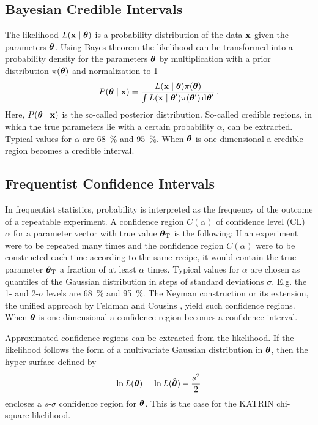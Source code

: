 \subsection{Bayesian Credible Intervals}
The likelihood $L\giventhat{\dataVec}{\paramVec}$ is a probability distribution of the data $\boldsymbol{\mathbf{x}}$ given the parameters $\boldsymbol{\mathbf{\theta}}$. Using Bayes theorem the likelihood can be transformed into a probability density for the parameters $\boldsymbol{\mathbf{\theta}}$ by multiplication with a prior distribution $\pi(\boldsymbol{\mathbf{\theta}})$ and normalization to 1
\begin{equation}
\label{eq:posterior}
	P\giventhat{\paramVec}{\dataVec} = 
		\frac{
			L\giventhat{\dataVec}{\paramVec}\pi(\paramVec)
		}{
			\int L\giventhat{\dataVec}{\paramVec^\prime}\pi(\paramVec^\prime) \d\paramVec^\prime
		}
	\fullstop
\end{equation}
Here, $P\giventhat{\paramVec}{\dataVec}$ is the so-called posterior distribution. So-called credible regions, in which the true parameters lie with a certain probability $\alpha$, can be extracted.  Typical values for $\alpha$ are \SI{68}{\percent} and \SI{95}{\percent}. When $\boldsymbol{\mathbf{\theta}}$ is one dimensional a credible region becomes a credible interval. 

\subsection{Frequentist Confidence Intervals}
In frequentist statistics, probability is interpreted as the frequency
of the outcome of a repeatable experiment. A confidence region $C(\alpha)$ of confidence level (CL) $\alpha$ for a parameter vector with true value $\boldsymbol{\mathbf{\theta}}_\mathrm{T}$ is the following: If an experiment were to be repeated many times and the confidence region $C(\alpha)$ were to be constructed each time according to the same recipe, it would contain the true parameter $\boldsymbol{\mathbf{\theta}}_\mathrm{T}$ a fraction of at least $\alpha$ times. Typical values for $\alpha$ are chosen as quantiles of the Gaussian distribution in steps of standard deviations $\sigma$. E.g. the 1- and 2-$\sigma$ levels are \SI{68}{\percent} and \SI{95}{\percent}. The Neyman construction \cite{Neyman1937} or its extension, the unified approach by Feldman and Cousins \cite{Feldman1998}, yield such confidence regions. When $\boldsymbol{\mathbf{\theta}}$ is one dimensional a confidence region becomes a confidence interval. 

Approximated confidence regions can be extracted from the likelihood. If the likelihood follows the form of a multivariate Gaussian distribution in $\boldsymbol{\mathbf{\theta}}$, then the hyper surface defined by
\begin{equation}
	\ln L(\boldsymbol{\mathbf{\theta}}) = 	\ln L(\hat{\boldsymbol{\mathbf{\theta}}}) - \frac{s^2}{2}
\end{equation}
encloses a $s$-$\sigma$ confidence region for $\boldsymbol{\mathbf{\theta}}$. This is the case for the KATRIN chi-square likelihood. 

